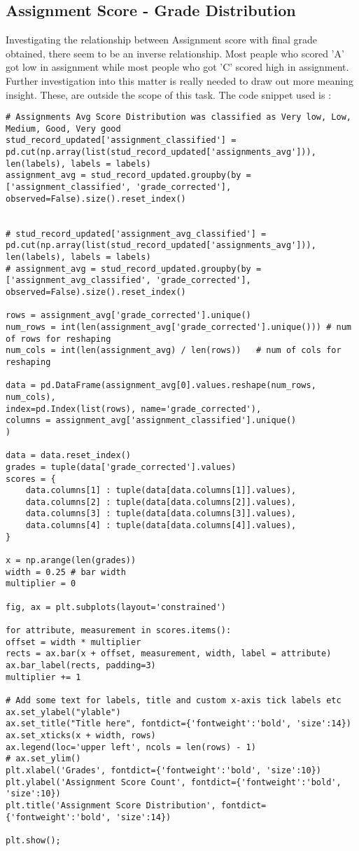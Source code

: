 \subsection{Assignment Score - Grade Distribution}
Investigating the relationship between Assignment score with final grade obtained, there seem to be an inverse relationship. Most peaple who scored 'A' got low in assignment while most people who got 'C' scored high in assignment. Further investigation into this matter is really needed to draw out more meaning insight. These, are outside the scope of this task. 
The code snippet used is : 
\begin{verbatim}
# Assignments Avg Score Distribution was classified as Very low, Low, Medium, Good, Very good
stud_record_updated['assignment_classified'] = pd.cut(np.array(list(stud_record_updated['assignments_avg'])), len(labels), labels = labels)
assignment_avg = stud_record_updated.groupby(by = ['assignment_classified', 'grade_corrected'], observed=False).size().reset_index()


# stud_record_updated['assignment_avg_classified'] = pd.cut(np.array(list(stud_record_updated['assignments_avg'])), len(labels), labels = labels)
# assignment_avg = stud_record_updated.groupby(by = ['assignment_avg_classified', 'grade_corrected'], observed=False).size().reset_index()

rows = assignment_avg['grade_corrected'].unique()
num_rows = int(len(assignment_avg['grade_corrected'].unique())) # num of rows for reshaping
num_cols = int(len(assignment_avg) / len(rows))   # num of cols for reshaping

data = pd.DataFrame(assignment_avg[0].values.reshape(num_rows, num_cols), 
index=pd.Index(list(rows), name='grade_corrected'),
columns = assignment_avg['assignment_classified'].unique()
)

data = data.reset_index()
grades = tuple(data['grade_corrected'].values)
scores = {
	data.columns[1] : tuple(data[data.columns[1]].values),
	data.columns[2] : tuple(data[data.columns[2]].values),
	data.columns[3] : tuple(data[data.columns[3]].values),
	data.columns[4] : tuple(data[data.columns[4]].values),
}

x = np.arange(len(grades))
width = 0.25 # bar width
multiplier = 0

fig, ax = plt.subplots(layout='constrained')

for attribute, measurement in scores.items():
offset = width * multiplier 
rects = ax.bar(x + offset, measurement, width, label = attribute)
ax.bar_label(rects, padding=3)
multiplier += 1

# Add some text for labels, title and custom x-axis tick labels etc
ax.set_ylabel("ylable")
ax.set_title("Title here", fontdict={'fontweight':'bold', 'size':14})
ax.set_xticks(x + width, rows)
ax.legend(loc='upper left', ncols = len(rows) - 1)
# ax.set_ylim()
plt.xlabel('Grades', fontdict={'fontweight':'bold', 'size':10})
plt.ylabel('Assignment Score Count', fontdict={'fontweight':'bold', 'size':10})
plt.title('Assignment Score Distribution', fontdict={'fontweight':'bold', 'size':14})

plt.show();
\end{verbatim}
